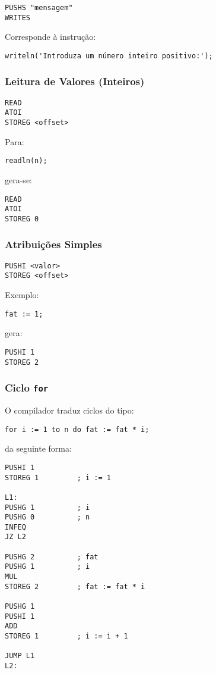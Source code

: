 \documentclass[12pt,a4paper]{report}%
\begin{document}
\begin{verbatim}
PUSHS "mensagem"
WRITES
\end{verbatim}

Corresponde à instrução:
\begin{verbatim}
writeln('Introduza um número inteiro positivo:');
\end{verbatim}

\subsubsection{Leitura de Valores (Inteiros)}

\begin{verbatim}
READ
ATOI
STOREG <offset>
\end{verbatim}

Para:
\begin{verbatim}
readln(n);
\end{verbatim}
gera-se:
\begin{verbatim}
READ
ATOI
STOREG 0
\end{verbatim}

\subsubsection{Atribuições Simples}

\begin{verbatim}
PUSHI <valor>
STOREG <offset>
\end{verbatim}

Exemplo:
\begin{verbatim}
fat := 1;
\end{verbatim}
gera:
\begin{verbatim}
PUSHI 1
STOREG 2
\end{verbatim}

\subsubsection{Ciclo \texttt{for}}

O compilador traduz ciclos do tipo:
\begin{verbatim}
for i := 1 to n do fat := fat * i;
\end{verbatim}
da seguinte forma:

\begin{verbatim}
PUSHI 1
STOREG 1         ; i := 1

L1:
PUSHG 1          ; i
PUSHG 0          ; n
INFEQ
JZ L2

PUSHG 2          ; fat
PUSHG 1          ; i
MUL
STOREG 2         ; fat := fat * i

PUSHG 1
PUSHI 1
ADD
STOREG 1         ; i := i + 1

JUMP L1
L2:
\end{verbatim}
\end{document}
